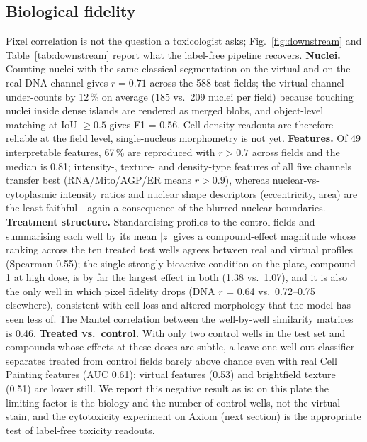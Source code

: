 \documentclass[11pt,a4paper]{article}
\begin{document}
\subsection{Biological fidelity}
Pixel correlation is not the question a toxicologist asks; Fig.~\ref{fig:downstream} and Table~\ref{tab:downstream} report what the label-free pipeline recovers. \textbf{Nuclei.} Counting nuclei with the same classical segmentation on the virtual and on the real DNA channel gives $r = 0.71$ across the 588 test fields; the virtual channel under-counts by 12\,\% on average (185 vs.\ 209 nuclei per field) because touching nuclei inside dense islands are rendered as merged blobs, and object-level matching at IoU $\ge 0.5$ gives F1 = 0.56. Cell-density readouts are therefore reliable at the field level, single-nucleus morphometry is not yet. \textbf{Features.} Of 49 interpretable features, 67\,\% are reproduced with $r > 0.7$ across fields and the median is 0.81; intensity-, texture- and density-type features of all five channels transfer best (RNA/Mito/AGP/ER means $r > 0.9$), whereas nuclear-vs-cytoplasmic intensity ratios and nuclear shape descriptors (eccentricity, area) are the least faithful---again a consequence of the blurred nuclear boundaries. \textbf{Treatment structure.} Standardising profiles to the control fields and summarising each well by its mean $|z|$ gives a compound-effect magnitude whose ranking across the ten treated test wells agrees between real and virtual profiles (Spearman 0.55); the single strongly bioactive condition on the plate, compound 1 at high dose, is by far the largest effect in both (1.38 vs.\ 1.07), and it is also the only well in which pixel fidelity drops (DNA $r$ = 0.64 vs.\ 0.72--0.75 elsewhere), consistent with cell loss and altered morphology that the model has seen less of. The Mantel correlation between the well-by-well similarity matrices is 0.46. \textbf{Treated vs.\ control.} With only two control wells in the test set and compounds whose effects at these doses are subtle, a leave-one-well-out classifier separates treated from control fields barely above chance even with real Cell Painting features (AUC 0.61); virtual features (0.53) and brightfield texture (0.51) are lower still. We report this negative result as is: on this plate the limiting factor is the biology and the number of control wells, not the virtual stain, and the cytotoxicity experiment on Axiom (next section) is the appropriate test of label-free toxicity readouts.
\end{document}
